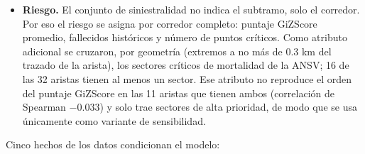 \documentclass[12pt,a4paper]{article}
\begin{document}
\begin{itemize}
INVÍAS ubicado sobre ese subtramo. La tarifa de categoría III se lee de
\texttt{peajes.csv}, mediante una tabla explícita entre el peaje del grafo y
su fila (nombre y código del peaje); el programa falla si un peaje no aparece
exactamente una vez.
\item \textbf{Riesgo.} El conjunto de siniestralidad no indica el subtramo,
solo el corredor. Por eso el riesgo se asigna por corredor completo: puntaje
GiZScore promedio, fallecidos históricos y número de puntos críticos. Como
atributo adicional se cruzaron, por geometría (extremos a no más de 0.3 km del
trazado de la arista), los sectores críticos de mortalidad de la ANSV; 16 de
las 32 aristas tienen al menos un sector. Ese atributo no reproduce el orden
del puntaje GiZScore en las 11 aristas que tienen ambos (correlación de
Spearman $-0.033$) y solo trae sectores de alta prioridad, de modo que se usa
únicamente como variante de sensibilidad.
\end{itemize}

Cinco hechos de los datos condicionan el modelo:
\end{document}
